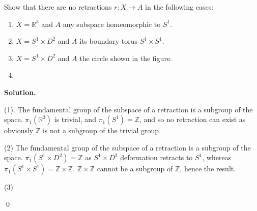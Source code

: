 \documentclass[12pt]{book}
\newcommand{\R}{\mathbb{R}}        %
\newcommand{\Z}{\mathbb{Z}}        %
\theoremstyle{definition}
\newenvironment{solution}
{%
  \par\noindent\textbf{Solution.}\quad
}
{%
  \qed\par
}
{
  \vspace{2pt}
}
\begin{document}
\begin{taggedexercise}[\textcolor{red}{TODO}]

  Show that there are no retractions $r : X \to A$ in the following cases: 
  \begin{enumerate}
    \item $X = \R^3$ and $A$ any subspace homeomorphic to $S^1$.
    \item $X = S^1 \times D^2$ and $A$ its boundary torus $S^1 \times S^1$.
    \item $X = S^1 \times D^2$ and $A$ the circle shown in the figure.
    \item 
  \end{enumerate}

\end{taggedexercise}
\begin{solution}
  
  (1). The fundamental group of the subspace of a retraction is a subgroup of the space. 
  $\pi_1(\R^3)$ is trivial, and $\pi_1(S^1) = \Z$, and so no retraction can exist as obviously 
  $\Z$ is not a subgroup of the trivial group.

  (2) The fundamental group of the subspace of a retraction is a subgroup of the space. 
  $\pi_1(S^1 \times D^2) = \Z$ as $S^1 \times D^2$ deformation retracts to $S^1$, whereas $\pi_1(S^1 \times S^1) = \Z \times \Z$.
  $\Z \times \Z$ cannot be a subgroup of $\Z$, hence the result.  

  (3) 

\end{solution}

\begin{taggedexercise}[\textcolor{red}{TODO}]
  
\end{taggedexercise}

\begin{taggedexercise}[\textcolor{red}{TODO}]
  
\end{taggedexercise}

\begin{taggedexercise}[\textcolor{red}{TODO}]
  
\end{taggedexercise}

\begin{taggedexercise}[\textcolor{red}{TODO}]
  
\end{taggedexercise}

\begin{taggedexercise}[\textcolor{red}{TODO}]
  
\end{taggedexercise}

\begin{taggedexercise}[\textcolor{red}{TODO}]
  
\end{taggedexercise}

\begin{taggedexercise}[\textcolor{red}{TODO}]
  
\end{taggedexercise}
\end{document}
